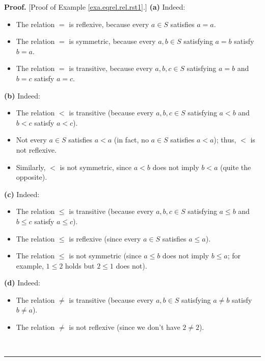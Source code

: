 \documentclass[numbers=enddot,12pt,final,onecolumn,notitlepage]{scrartcl}%
\numberwithin{exer}{subsection}
\theoremstyle{definition}
\newenvironment{proof}[1][Proof]{\noindent\textbf{#1.} }{\ \rule{0.5em}{0.5em}}
\begin{document}
\begin{proof}
[Proof of Example \ref{exa.eqrel.rel.rst1}.] \textbf{(a)} Indeed:

\begin{itemize}
\item The relation $=$ is reflexive, because every $a\in S$ satisfies $a=a$.

\item The relation $=$ is symmetric, because every $a,b\in S$ satisfying $a=b$
satisfy $b=a$.

\item The relation $=$ is transitive, because every $a,b,c\in S$ satisfying
$a=b$ and $b=c$ satisfy $a=c$.
\end{itemize}

\textbf{(b)} Indeed:

\begin{itemize}
\item The relation $<$ is transitive (because every $a,b,c\in S$ satisfying
$a<b$ and $b<c$ satisfy $a<c$).

\item Not every $a\in S$ satisfies $a<a$ (in fact, no $a\in S$ satisfies
$a<a$); thus, $<$ is not reflexive.

\item Similarly, $<$ is not symmetric, since $a<b$ does not imply $b<a$ (quite
the opposite).
\end{itemize}

\textbf{(c)} Indeed:

\begin{itemize}
\item The relation $\leq$ is transitive (because every $a,b,c\in S$ satisfying
$a\leq b$ and $b\leq c$ satisfy $a\leq c$).

\item The relation $\leq$ is reflexive (since every $a\in S$ satisfies $a\leq
a$).

\item The relation $\leq$ is not symmetric (since $a\leq b$ does not imply
$b\leq a$; for example, $1\leq2$ holds but $2\leq1$ does not).
\end{itemize}

\textbf{(d)} Indeed:

\begin{itemize}
\item The relation $\neq$ is transitive (because every $a,b\in S$ satisfying
$a\neq b$ satisfy $b\neq a$).

\item The relation $\neq$ is not reflexive (since we don't have $2\neq2$).


\end{itemize}
\end{proof}
\end{document}
